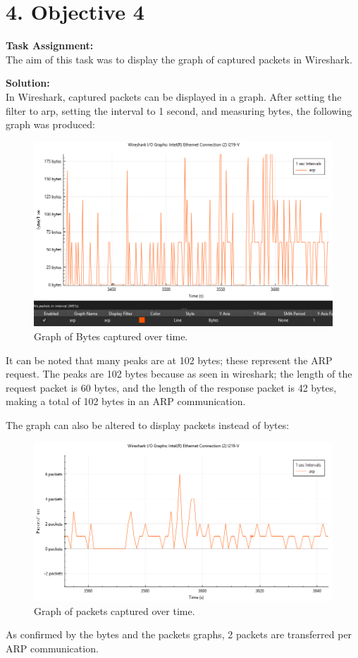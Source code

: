 \documentclass[a4paper,12pt]{article}
\begin{document}
\section*{4. Objective 4}

\textbf{Task Assignment:} \\
The aim of this task was to display the graph of captured packets in Wireshark.

\textbf{Solution:} \\
In Wireshark, captured packets can be displayed in a graph. After setting the filter to arp, setting the interval to 1 second, and measuring bytes, the following graph was produced:

\begin{figure}[H]
\centering
\includegraphics[width=\linewidth, keepaspectratio]{Pictures_Lab1/graph zoomed in.png}
\caption{Graph of Bytes captured over time.}
\end{figure}

It can be noted that many peaks are at 102 bytes; these represent the ARP request. The peaks are 102 bytes because as seen in wireshark; the length of the request packet is 60 bytes, and the length of the response packet is 42 bytes, making a total of 102 bytes in an ARP communication.

The graph can also be altered to display packets instead of bytes:
\begin{figure}[H]
\centering
\includegraphics[width=\linewidth,keepaspectratio]{Pictures_Lab1/packets graph obj 4.png}
\caption{Graph of packets captured over time.}
\end{figure}
As confirmed by the bytes and the packets graphs, 2 packets are transferred per ARP communication.
\end{document}
